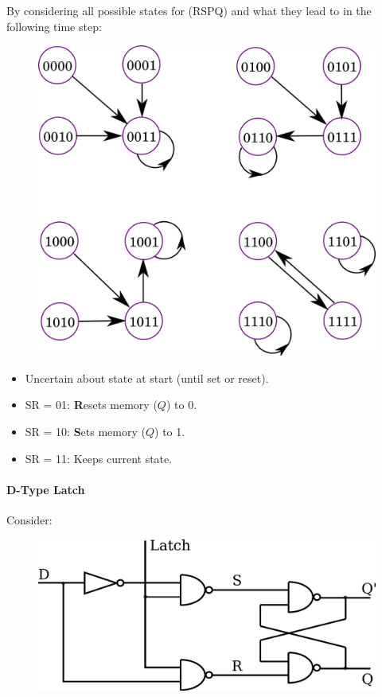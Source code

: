 \documentclass[twocolumn,english]{article}
\begin{document}
By considering all possible states for (RSPQ) and what they lead to
in the following time step:

\begin{figure}[H]
\noindent \centering{}\includegraphics[width=0.25\paperwidth]{img/fsmr}
\end{figure}

\begin{itemize}
\item Uncertain about state at start (until set or reset).
\item SR = 01: \textbf{R}esets memory ($Q$) to 0.
\item SR = 10: \textbf{S}ets memory ($Q$) to 1.
\item SR = 11: Keeps current state.
\end{itemize}

\paragraph{D-Type Latch}

Consider:

\begin{figure}[H]
\noindent \centering{}\includegraphics[width=0.2\paperwidth]{img/d-latch}
\end{figure}
\end{document}
